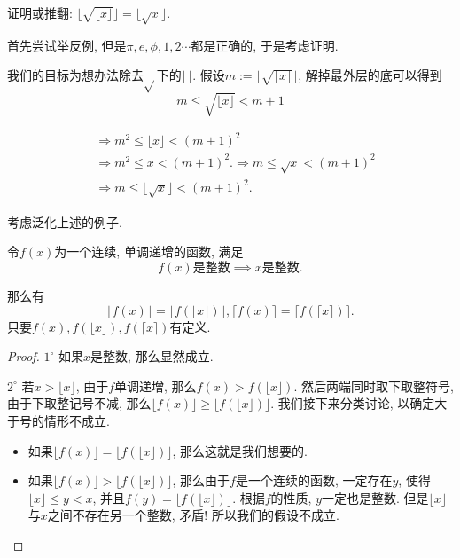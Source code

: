 \documentclass{ctexart}
\begin{document}
\begin{example}
    证明或推翻: $\lfloor\sqrt{\lfloor x\rfloor}\rfloor=\lfloor\sqrt{x}\rfloor$.

首先尝试举反例, 但是$\pi, e, \phi, 1,2 \cdots$都是正确的, 于是考虑证明. 

我们的目标为想办法除去$\sqrt{ }$下的$\lfloor\rfloor$. 假设$m:=\lfloor\sqrt{\lfloor x\rfloor}\rfloor$, 解掉最外层的底可以得到
$$
m \leqslant \sqrt{\lfloor x\rfloor}<m+1
$$

$$
\begin{aligned}
& \Rightarrow m^2 \leqslant\lfloor x\rfloor<(m+1)^2 \\
& \Rightarrow m^2 \leqslant x<(m+1)^2 . \Longrightarrow m \leqslant \sqrt{x}<(m+1)^2 \\
& \Rightarrow m \leqslant\lfloor\sqrt{x}\rfloor<(m+1)^2 .
\end{aligned}
$$
    
\end{example}

考虑泛化上述的例子. 

\begin{theorem}
    令$f(x)$为一个连续, 单调递增的函数, 满足
    \[
        f(x) \text{是整数} \implies x\text{是整数}. 
    \]

    那么有
    $$
\lfloor f(x)\rfloor=\lfloor f(\lfloor x\rfloor)\rfloor,\lceil f(x)\rceil=\lceil f(\lceil x \rceil)\rceil .
$$
只要$f(x), f(\lfloor x\rfloor), f(\lceil x\rceil)$有定义. 
\end{theorem}

\begin{proof}
    $1^\circ$ 如果$x$是整数, 那么显然成立. 

    $2^\circ$ 若$x>\lfloor x\rfloor$, 由于$f$单调递增, 那么$f(x)>f(\lfloor x\rfloor)$. 然后两端同时取下取整符号, 由于下取整记号不减, 那么$\lfloor f(x)\rfloor \geqslant\lfloor f(\lfloor x\rfloor)\rfloor$. 我们接下来分类讨论, 以确定大于号的情形不成立. 
    \begin{itemize}
        \item 如果$\lfloor f(x)\rfloor =\lfloor f(\lfloor x\rfloor)\rfloor$, 那么这就是我们想要的. 
        \item 如果$\lfloor f(x)\rfloor>\lfloor f(\lfloor x\rfloor)\rfloor$, 那么由于$f$是一个连续的函数, 一定存在$y$, 使得$\lfloor x\rfloor \leqslant y<x$, 并且$f(y)=\lfloor f(\lfloor x\rfloor)\rfloor$. 根据$f$的性质, $y$一定也是整数. 但是$\lfloor x\rfloor$与$x$之间不存在另一个整数, 矛盾! 所以我们的假设不成立.  
    \end{itemize}
\end{proof}
\end{document}
